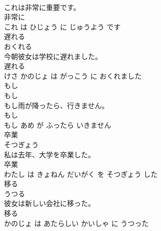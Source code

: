 \documentclass[8pt]{extreport}
\begin{document}
\begin{CJK}{UTF8}{min}
\\	これは非常に重要です。	
\\	非常に 
\\	これ は ひじょう に じゅうよう です			
\\	遅れる	
\\	おくれる			
\\	今朝彼女は学校に遅れました。	
\\	遅れる 
\\	けさ かのじょ は がっこう に おくれました			
\\	もし	
\\	もし			
\\	もし雨が降ったら、行きません。	
\\	もし 
\\	もし あめ が ふったら いきません			
\\	卒業	
\\	そつぎょう			
\\	私は去年、大学を卒業した。	
\\	卒業 
\\	わたし は きょねん だいがく を そつぎょう した			
\\	移る	
\\	うつる			
\\	彼女は新しい会社に移った。	
\\	移る 
\\	かのじょ は あたらしい かいしゃ に うつった			
\end{CJK}
\end{document}
